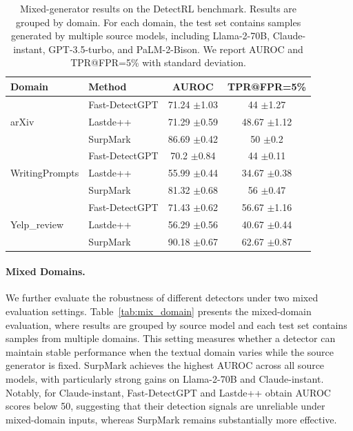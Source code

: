 \documentclass{article}
\newcommand{\com}[1]{\tiny$\pm$#1}
\theoremstyle{plain}
\theoremstyle{definition}
\theoremstyle{remark}
\begin{document}
\vspace{-2mm}
\begin{table}[t]
\centering
\caption{Mixed-generator results on the DetectRL benchmark. Results are grouped by domain. For each domain, the test set contains samples generated by multiple source models, including Llama-2-70B, Claude-instant, GPT-3.5-turbo, and PaLM-2-Bison. We report AUROC and TPR@FPR=5\% with standard deviation.}
\label{tab:mix_generator}
{\scriptsize
\begin{tabular}{llcc}
\toprule
Domain & Method & AUROC & TPR@FPR=5\% \\
\midrule
\multirow{3}{*}{arXiv}
& Fast-DetectGPT & 71.24 \com 1.03 & 44 \com 1.27 \\
& Lastde++ & 71.29 \com 0.59 & 48.67 \com 1.12 \\

& \cellcolor{ours}SurpMark & \cellcolor{ours} 86.69 \com 0.42 & \cellcolor{ours} 50 \com 0.2 \\
\midrule
\multirow{3}{*}{WritingPrompts}
& Fast-DetectGPT & 70.2 \com 0.84 & 44 \com 0.11 \\
& Lastde++ & 55.99 \com 0.44 & 34.67 \com 0.38 \\

& \cellcolor{ours}SurpMark & \cellcolor{ours}81.32 \com 0.68 & \cellcolor{ours}56 \com 0.47 \\
\midrule
\multirow{3}{*}{Yelp\_review}
& Fast-DetectGPT & 71.43 \com 0.62 & 56.67 \com 1.16 \\
& Lastde++ & 56.29 \com 0.56 & 40.67 \com 0.44 \\

& \cellcolor{ours}SurpMark & \cellcolor{ours}90.18 \com 0.67 & \cellcolor{ours}62.67 \com 0.87 \\
\bottomrule
\end{tabular}}
\end{table}

\paragraph{Mixed Domains.}
We further evaluate the robustness of different detectors under two mixed evaluation settings. 
Table~\ref{tab:mix_domain} presents the mixed-domain evaluation, where results are grouped by source model and each test set contains samples from multiple domains. 
This setting measures whether a detector can maintain stable performance when the textual domain varies while the source generator is fixed. 
SurpMark achieves the highest AUROC across all source models, with particularly strong gains on Llama-2-70B and Claude-instant. 
Notably, for Claude-instant, Fast-DetectGPT and Lastde++ obtain AUROC scores below 50, suggesting that their detection signals are unreliable under mixed-domain inputs, whereas SurpMark remains substantially more effective.
\vspace{-2mm}
\end{document}
